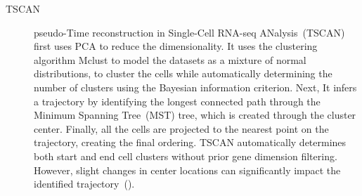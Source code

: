 \begin{description}
  \item[TSCAN]
  pseudo-Time reconstruction in Single-Cell RNA-seq ANalysis~(TSCAN)~\citep{ji2016tscan} first uses PCA to reduce the dimensionality. It uses the clustering algorithm Mclust to model the datasets as a mixture of normal distributions, to cluster the cells while automatically determining the number of clusters using the Bayesian information criterion. Next, It infers a trajectory by identifying the longest connected path through the Minimum Spanning Tree~(MST) tree, which is created through the cluster center. Finally, all the cells are projected to the nearest point on the trajectory, creating the final ordering. TSCAN automatically determines both start and end cell clusters without prior gene dimension filtering. However, slight changes in center locations can significantly impact the identified trajectory~().


\end{description}

